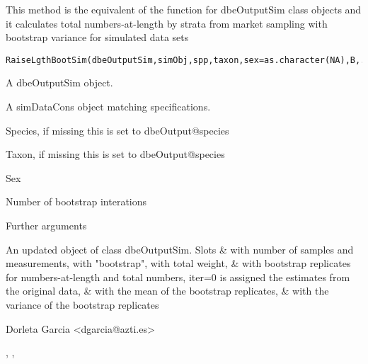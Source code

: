 \begin{Description}\relax
This method is the equivalent of the function  for dbeOutputSim class objects and 
it calculates total numbers-at-length by strata from market sampling with bootstrap variance for simulated data sets
\end{Description}
\begin{Usage}
\begin{verbatim}
RaiseLgthBootSim(dbeOutputSim,simObj,spp,taxon,sex=as.character(NA),B,...)
\end{verbatim}
\end{Usage}
\begin{Arguments}
\begin{ldescription}
\item[\code{dbeOutputSim}] A dbeOutputSim object.
\item[\code{simObj}] A simDataCons object matching  specifications.
\item[\code{spp}] Species, if missing this is set to dbeOutput@species
\item[\code{taxon}] Taxon, if missing this is set to dbeOutput@species
\item[\code{sex}] Sex
\item[\code{B}] Number of bootstrap interations
\item[\code{...}] Further arguments
\end{ldescription}
\end{Arguments}
\begin{Value}
An updated object of class dbeOutputSim.
Slots  \&  with number of samples and measurements,
 with "bootstrap",
 with total weight,
 \&  with bootstrap replicates for numbers-at-length and total numbers, iter=0 is assigned the estimates from the original data,
 \&  with the mean of the bootstrap replicates,
 \&  with the variance of the bootstrap replicates
\end{Value}
\begin{Author}\relax
Dorleta Garcia <dgarcia@azti.es>
\end{Author}
\begin{SeeAlso}\relax
{}, , 
\end{SeeAlso}

